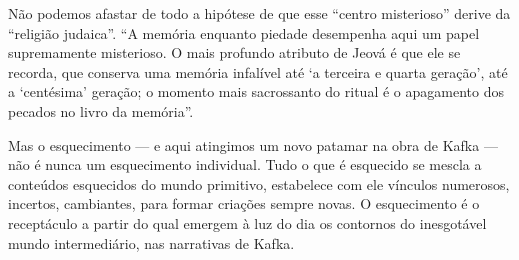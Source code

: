 \begin{quote}
\end{quote}

Não podemos afastar de todo a hipótese de
que esse ``centro misterioso'' derive da ``religião judaica''. ``A
memória enquanto piedade desempenha aqui um papel supremamente
misterioso. O mais profundo atributo de Jeová é que ele se recorda, que
conserva uma memória infalível até `a terceira e quarta geração', até a
`centésima' geração; o momento mais sacrossanto do ritual é o apagamento
dos pecados no livro da memória''.

Mas o esquecimento --- e aqui atingimos um novo patamar na obra de Kafka
--- não é nunca um esquecimento individual. Tudo o que é esquecido se
mescla a conteúdos esquecidos do mundo primitivo, estabelece com ele
vínculos numerosos, incertos, cambiantes, para formar criações sempre
novas. O esquecimento é o receptáculo a partir do qual emergem à luz do
dia os contornos do inesgotável mundo intermediário, nas narrativas de
Kafka. 

\begin{quote}
\end{quote}

